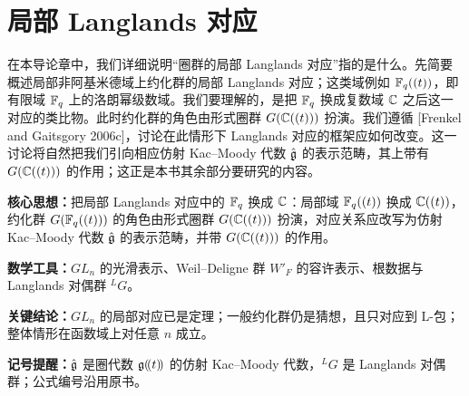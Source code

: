 
\chapter{局部 Langlands 对应}

在本导论章中，我们详细说明“圈群的局部 Langlands 对应”指的是什么。先简要概述局部非阿基米德域上约化群的局部 Langlands 对应；这类域例如 $\mathbb{F}_q((t))$，即有限域 $\mathbb{F}_q$ 上的洛朗幂级数域。我们要理解的，是把 $\mathbb{F}_q$ 换成复数域 $\mathbb{C}$ 之后这一对应的类比物。此时约化群的角色由形式圈群 $G(\mathbb{C}((t)))$ 扮演。我们遵循 [Frenkel and Gaitsgory 2006c]，讨论在此情形下 Langlands 对应的框架应如何改变。这一讨论将自然把我们引向相应仿射 Kac--Moody 代数 $\hat{\mathfrak{g}}$ 的表示范畴，其上带有 $G(\mathbb{C}((t)))$ 的作用；这正是本书其余部分要研究的内容。


\begin{keypoints}
    \item \textbf{核心思想：}把局部 Langlands 对应中的 $\mathbb{F}_q$ 换成 $\mathbb{C}$：局部域 $\mathbb{F}_q((t))$ 换成 $\mathbb{C}((t))$，约化群 $G(\mathbb{F}_q((t)))$ 的角色由形式圈群 $G(\mathbb{C}((t)))$ 扮演，对应关系应改写为仿射 Kac--Moody 代数 $\hat{\mathfrak{g}}$ 的表示范畴，并带 $G(\mathbb{C}((t)))$ 的作用。
    \item \textbf{数学工具：}$GL_n$ 的光滑表示、Weil--Deligne 群 $W'_F$ 的容许表示、根数据与 Langlands 对偶群 ${}^L G$。
    \item \textbf{关键结论：}$GL_n$ 的局部对应已是定理；一般约化群仍是猜想，且只对应到 L-包；整体情形在函数域上对任意 $n$ 成立。
    \item \textbf{记号提醒：}$\hat{\mathfrak{g}}$ 是圈代数 $\mathfrak{g}(\!(t)\!)$ 的仿射 Kac--Moody 代数，${}^L G$ 是 Langlands 对偶群；公式编号沿用原书。
\end{keypoints}


